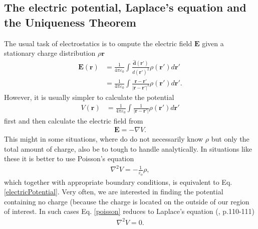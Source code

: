 \subsection{The electric potential, Laplace's equation and the Uniqueness Theorem}
The usual task of electrostatics is to ompute the electric field $\boldsymbol{E}$ given a 
stationary charge distribution $\rho{\boldsymbol{r}}$
\begin{align}
   \boldsymbol{E}(\boldsymbol{r}) 
   &= \frac{1}{4 \pi \varepsilon_0} \int \frac{\boldsymbol{\hat{d}}(\boldsymbol{r'})}
                                              {d(\boldsymbol{r'})^2} 
                                                            \rho(\boldsymbol{r'}) d\!\boldsymbol{r'} 
                                                            \\
   &= \frac{1}{4 \pi \varepsilon_0} \int \frac{\boldsymbol{r} - \boldsymbol{r'}}
                                              {\big|\boldsymbol{r} - \boldsymbol{r'}\big|^3} 
                                                           \rho(\boldsymbol{r'}) d\!\boldsymbol{r'}.
\end{align}
However, it is usually simpler to calculate the potential
\begin{align}
   \label{electricPotential}
   V(\boldsymbol{r}) 
   &= \frac{1}{4 \pi \varepsilon_0} \int \frac{1}{\big|\boldsymbol{r} - \boldsymbol{r'}\big|} 
                                                           \rho(\boldsymbol{r'}) d\!\boldsymbol{r'}
\end{align}
first and then calculate the electric field from
\begin{align}
   \boldsymbol{E} = - \nabla V.
\end{align}
This might in some situations, where do do not necessarily know $\rho$ but only the total amount of 
charge, also be to tough to handle analytically. In situations like these it is better to use
Poisson's equation
\begin{align}
   \label{poisson}
   \nabla^2 V= - \frac{1}{\varepsilon_o} \rho,
\end{align}
which together with appropriate boundary conditions, is equivalent to Eq.\eqref{electricPotential}.
Very often, we are interested in finding the potential containing no charge (because the charge is 
located on the outside of our region of interest. In such cases Eq. \eqref{poisson} reduces to
Laplace's equation (\cite{Griffiths}, p.110-111)
\begin{align}
   \label{laplace}
   \nabla^2 V = 0.
\end{align}
